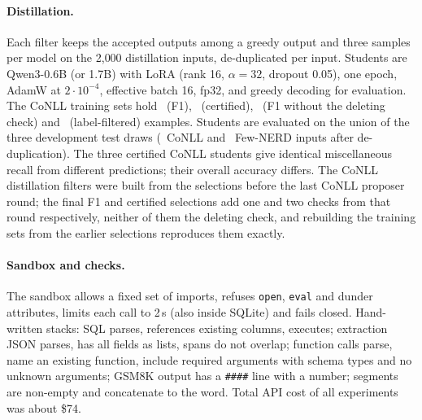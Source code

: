 \documentclass[11pt]{article}
\begin{document}
\paragraph{Distillation.} Each filter keeps the accepted outputs among a
greedy output and three samples per model on the 2{,}000 distillation
inputs, de-duplicated per input. Students are Qwen3-0.6B (or 1.7B) with LoRA
(rank 16, $\alpha=32$, dropout 0.05), one epoch, AdamW at $2\cdot10^{-4}$,
effective batch 16, fp32, and greedy decoding for evaluation. The CoNLL
training sets hold \szFone\ (F1), \szCert\ (certified), \szAbl\ (F1 without
the deleting check) and \szOracle\ (label-filtered) examples. Students are
evaluated on the union of the three development test draws (\szEvalIE\
CoNLL and \szEvalFewnerd\ Few-NERD inputs after de-duplication). The three certified CoNLL
students give identical miscellaneous recall from different predictions;
their overall accuracy differs. The CoNLL
distillation filters were built from the selections before the last CoNLL
proposer round; the final F1 and certified selections add one and two
checks from that round respectively, neither of them the deleting check,
and rebuilding the training sets from the earlier selections reproduces
them exactly.
\paragraph{Sandbox and checks.} The
sandbox allows a fixed set of imports, refuses \texttt{open}, \texttt{eval}
and dunder attributes, limits each call to 2\,s (also inside SQLite) and
fails closed. Hand-written stacks: SQL parses, references existing columns,
executes; extraction JSON parses, has all fields as lists, spans do not
overlap; function calls parse, name an existing function, include required
arguments with schema types and no unknown arguments; GSM8K output has a
\texttt{\#\#\#\#} line with a number; segments are non-empty and
concatenate to the word. Total API cost of all experiments was about \$74.
\end{document}
